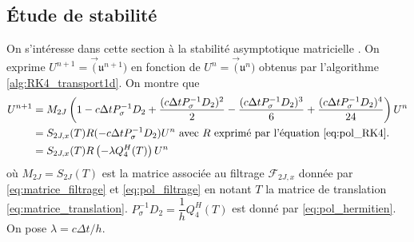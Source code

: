 \subsection{Étude de stabilité}

On s'intéresse dans cette section à la stabilité asymptotique matricielle \cite{Butcher2016,Hirsch2007}.
On exprime $U^{n+1} = \vec(\mathfrak{u}^{n+1})$ en fonction de $U^{n} = \vec(\mathfrak{u}^{n})$ obtenus par l'algorithme \ref{alg:RK4_transport1d}. On montre que
\begin{align*}
U^{n+1} & = M_{2J} \left( 1 - c \Delta t P_{\sigma}^{-1}D_2 + \dfrac{(c \Delta t P_{\sigma}^{-1}D_2)^2}{2} - \dfrac{(c \Delta t P_{\sigma}^{-1}D_2)^3}{6} + \dfrac{(c \Delta t P^{-1}_{\sigma}D_2)^4}{24} \right) U^n \\
		& = S_{2J,x}(T) R(- c \Delta t P_{\sigma}^{-1}D_2) U^n \text{ avec } R \text{ exprimé par l'équation \eqref{eq:pol_RK4}.}\\
		& = S_{2J,x}(T) R \left( -\lambda Q_{4}^H(T) \right) U^n
\end{align*}
où $M_{2J}=S_{2J}(T)$ est la matrice associée au filtrage $\mathcal{F}_{2J,x}$ donnée par \eqref{eq:matrice_filtrage} et \eqref{eq:pol_filtrage} en notant $T$ la matrice de translation \eqref{eq:matrice_translation}. $P^{-1}_{\sigma}D_2 = \dfrac{1}{h}Q_4^H(T)$ est donné par \eqref{eq:pol_hermitien}. On pose $\lambda = c \Delta t / h$.

